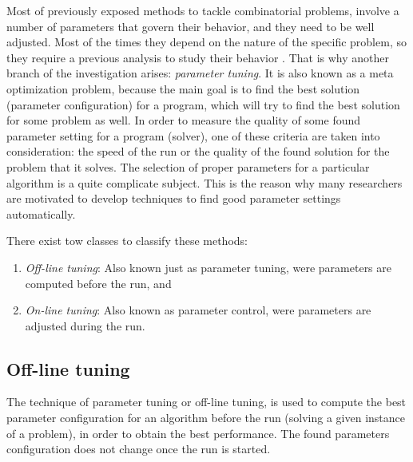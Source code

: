 Most of previously exposed methods to tackle combinatorial problems, involve a number of parameters that govern their behavior, and they need to be well adjusted. Most of the times they depend on the nature of the specific problem, so they require a previous analysis to study their behavior \cite{Birattari2005}. That is why another branch of the investigation arises: {\it parameter tuning}. It is also known as a meta optimization problem, because the main goal is to find the best solution (parameter configuration) for a program, which will try to find the best solution for some problem as well. In order to measure the quality of some found parameter setting for a program (solver), one of these criteria are taken into consideration: the speed of the run or the quality of the found solution for the problem that it solves. The selection of proper parameters for a particular algorithm is a quite complicate subject. This is the reason why many researchers are motivated to develop techniques to find good parameter settings automatically.

There exist tow classes to classify these methods: 
\begin{enumerate}
\item \textit{Off-line tuning}: Also known just as parameter tuning, were parameters are computed before the run, and
\item \textit{On-line tuning}: Also known as parameter control, were parameters are adjusted during the run.
\end{enumerate}

\subsection{Off-line tuning}

The technique of parameter tuning or off-line tuning, is used to compute the best parameter configuration for an algorithm before the run (solving a given instance of a problem), in order to obtain the best performance. The found parameters configuration does not change once the run is started. 

